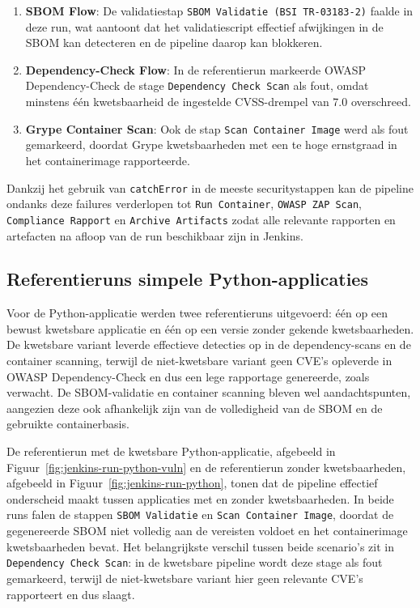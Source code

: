 \begin{enumerate}
    \item \textbf{SBOM Flow}: De validatiestap \texttt{SBOM Validatie (BSI TR-03183-2)} faalde in deze run, wat aantoont dat het validatiescript effectief afwijkingen in de SBOM kan detecteren en de pipeline daarop kan blokkeren.
    \item \textbf{Dependency-Check Flow}: In de referentierun markeerde OWASP\\Dependency-Check de stage \texttt{Dependency Check Scan} als fout, omdat minstens één kwetsbaarheid de ingestelde CVSS-drempel van 7.0 overschreed.
    \item \textbf{Grype Container Scan}: Ook de stap \texttt{Scan Container Image} werd als fout gemarkeerd, doordat Grype kwetsbaarheden met een te hoge ernstgraad in het containerimage rapporteerde.
\end{enumerate}

Dankzij het gebruik van \texttt{catchError} in de meeste securitystappen kan de pipeline ondanks deze failures verderlopen tot \texttt{Run Container}, \texttt{OWASP ZAP Scan}, \texttt{Compliance Rapport} en \texttt{Archive Artifacts} zodat alle relevante rapporten en artefacten na afloop van de run beschikbaar zijn in Jenkins.

\subsection{Referentieruns simpele Python-applicaties}
\label{ch:python-apps}

Voor de Python-applicatie werden twee referentieruns uitgevoerd: één op een bewust kwetsbare applicatie en één op een versie zonder gekende kwetsbaarheden. De kwetsbare variant leverde effectieve detecties op in de dependency-scans en de container scanning, terwijl de niet-kwetsbare variant geen CVE's opleverde in OWASP Dependency-Check en dus een lege rapportage genereerde, zoals\\verwacht. De SBOM-validatie en container scanning bleven wel aandachtspunten, aangezien deze ook afhankelijk zijn van de volledigheid van de SBOM en de gebruikte containerbasis.

De referentierun met de kwetsbare Python-applicatie, afgebeeld in Figuur~\ref{fig:jenkins-run-python-vuln} en de referentierun zonder kwetsbaarheden, afgebeeld in Figuur~\ref{fig:jenkins-run-python}, tonen dat de pipeline effectief onderscheid maakt tussen applicaties met en zonder kwetsbaarheden. In beide runs falen de stappen \texttt{SBOM Validatie} en \texttt{Scan Container Image}, doordat de gegenereerde SBOM niet volledig aan de vereisten voldoet en het containerimage kwetsbaarheden bevat. Het belangrijkste verschil tussen beide scenario's zit in \texttt{Dependency Check Scan}: in de kwetsbare pipeline wordt deze stage als fout gemarkeerd, terwijl de niet-kwetsbare variant hier geen relevante CVE's rapporteert en dus slaagt.


